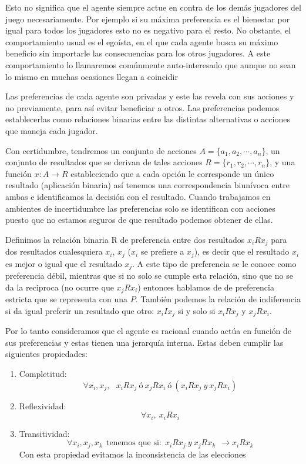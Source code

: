 \documentclass[12pt,a4paper,]{book}
\providecommand{\tightlist}{%
  \setlength{\itemsep}{0pt}\setlength{\parskip}{0pt}}
\numberwithin{dummy}{section}
\theoremstyle{ocrenumbox}
\theoremstyle{blacknumex}
\theoremstyle{blacknumbox}
\theoremstyle{ocrenum}
\theoremstyle{ocrenum}
\begin{document}
Esto no significa que el agente siempre actue en contra de los demás
jugadores del juego necesariamente. Por ejemplo si su máxima preferencia
es el bienestar por igual para todos los jugadores esto no es negativo
para el resto. No obstante, el comportamiento usual es el egoísta, en el
que cada agente busca su máximo beneficio sin importarle las
consecuencias para los otros jugadores. A este comportamiento lo
llamaremos comúnmente auto-interesado que aunque no sean lo mismo en
muchas ocasiones llegan a coincidir

Las preferencias de cada agente son privadas y este las revela con sus
acciones y no previamente, para así evitar beneficiar a otros. Las
preferencias podemos establecerlas como relaciones binarias entre las
distintas alternativas o acciones que maneja cada jugador.

Con certidumbre, tendremos un conjunto de acciones
\(A=\{a_1, a_2,\cdots,a_n\}\), un conjunto de resultados que se derivan
de tales acciones \(R=\{r_1,r_2,\cdots,r_n\}\), y una función
\(x: A \rightarrow R\) estableciendo que a cada opción le corresponde un
único resultado (aplicación binaria) así tenemos una correspondencia
biunívoca entre ambas e identificamos la decisión con el resultado.
Cuando trabajamos en ambientes de incertidumbre las preferencias solo se
identifican con acciones puesto que no estamos seguros de que resultado
podemos obtener de ellas.

Definimos la relación binaria R de preferencia entre dos resultados
\(x_iRx_j\) para dos resultados cualesquiera \(x_i\), \(x_j\) (\(x_i\)
se prefiere a \(x_j\)), es decir que el resultado \(x_i\) es mejor o
igual que el resultado \(x_j\). A este tipo de preferencia se le conoce
como preferencia débil, mientras que si no solo se cumple esta relación,
sino que no se da la reciproca (no ocurre que \(x_jRx_i\)) entonces
hablamos de de preferencia estricta que se representa con una \(P\).
También podemos la relación de indiferencia si da igual preferir un
resultado que otro: \(x_iIx_j\) si y solo si \(x_iRx_j\) y \(x_jRx_i\).

Por lo tanto consideramos que el agente es racional cuando actúa en
función de sus preferencias y estas tienen una jerarquía interna. Estas
deben cumplir las siguientes propiedades:

\begin{enumerate}
\def\labelenumi{\arabic{enumi}.}
\tightlist
\item
  Completitud: \[
  \forall x_i,x_j, \ \ \ x_iRx_j \ ó \ x_jRx_i \ ó \ (x_iRx_j \ y \ x_jRx_i )
  \]
\item
  Reflexividad: \[
  \forall x_i, \ x_iRx_i
  \]
\item
  Transitividad: \[
  \forall x_i,x_j,x_k \ \ \text{tenemos que si:} \ \ x_iRx_j \ y \ x_jRx_k \ \ \rightarrow x_iRx_k
  \] Con esta propiedad evitamos la inconsistencia de las elecciones
\end{enumerate}
\end{document}
